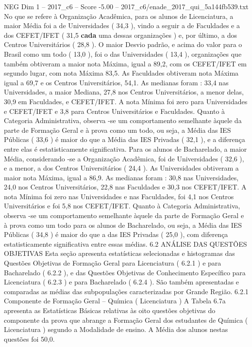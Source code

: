 \begin{textsample}{NEG Dim 1 – 2017\_c6 – Score -5.00 – 2017\_c6/enade\_2017\_qui\_5a144fb539.txt}
No que se refere à Organização Acadêmica, para os alunos de Licenciatura, a maior Média foi a de Universidades ( 34,3 ), vindo a seguir a de Faculdades e a dos CEFET/IFET ( 31,5 \textbf{cada} uma dessas organizações ) e, por último, a dos Centros Universitários ( 28,8 ).
O maior Desvio padrão, e acima do valor para o Brasil como um todo ( 13,0 ), foi o das Universidades ( 13,4 ), organizações que também obtiveram a maior nota Máxima, igual a 89,2, com os CEFET/IFET em segundo lugar, com nota Máxima 83,5.
As Faculdades obtiveram nota Máxima igual a 69,7 e os Centros Universitários, 54,1.
As medianas foram : 33,4 nas Universidades, a maior Mediana, 27,8 nos Centros Universitários, a menor delas, 30,9 em Faculdades, e CEFET/IFET.
A nota Mínima foi zero para Universidades e CEFET/IFET e 3,8 para Centros Universitários e Faculdades.
Quanto à Categoria Administrativa, observa -se um comportamento semelhante àquele da parte de Formação Geral e à prova como um todo, ou seja, a Média das IES Públicas ( 33,6 ) é maior do que a Média das IES Privadas ( 32,1 ), e a diferença entre elas é estatisticamente significativa.
Para os alunos de Bacharelado, a maior Média, considerando -se a Organização Acadêmica, foi de Universidades ( 32,6 ), e a menor, a dos Centros Universitários ( 24,4 ).
As Universidades obtiveram a maior nota Máxima, igual a 86,9.
As medianas foram : 30,8 nas Universidades, 24,0 nos Centros Universitários, 22,8 nas Faculdades e 30,3 nos CEFET/IFET.
A nota Mínima foi zero nas Universidades e nas Faculdades, foi 4,1 nos Centros Universitários e foi 5,8 nos CEFET/IFET.
Quanto à Categoria Administrativa, observa -se um comportamento semelhante àquele da parte de Formação Geral e à prova como um todo para os alunos de Bacharelado, ou seja, a Média das IES Públicas ( 34,8 ) é maior do que a das IES Privadas ( 25,0 ), com diferença estatisticamente significativa entre essas médias. 6.2 ANÁLISE DAS QUESTÕES OBJETIVAS Esta seção apresenta estatísticas selecionadas e histogramas das Questões Objetivas de Formação Geral para Licenciatura ( 6.2.1 ) e para Bacharelado ( 6.2.2 ), e das Questões Objetivas de Conhecimento Específico para Licenciatura ( 6.2.3 ) e para Bacharelado ( 6.2.4 ).
São também apresentadas e comparadas as médias das subpopulações caracterizadas por Grande Região. 6.2.1 Componente de Formação Geral – Química ( Licenciatura ) A Tabela 6.7a apresenta as Estatísticas Básicas relativas às oito questões objetivas do componente da prova que abrange a Formação Geral dos estudantes de Química ( Licenciatura ) segundo a Modalidade de ensino.
A Média dos alunos nestas questões foi 50,0.

\end{textsample}
